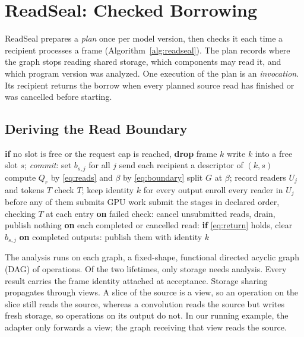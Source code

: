 \documentclass[conference]{IEEEtran}
\begin{document}
\section{ReadSeal: Checked Borrowing}
\label{sec:readseal}

ReadSeal prepares a \emph{plan} once per model version, then checks it each time a recipient processes a frame (Algorithm~\ref{alg:readseal}). The plan records where the graph stops reading shared storage, which components may read it, and which program version was analyzed. One execution of the plan is an \emph{invocation}. Its recipient returns the borrow when every planned source read has finished or was cancelled before starting.

\subsection{Deriving the Read Boundary}
\label{sec:derive}

\begin{algorithm}[t]
\caption{BIM's commit and ReadSeal's plan and invocation}
\label{alg:readseal}
\footnotesize
\begin{algorithmic}[1]
\State \textbf{if} no slot is free or the request cap is reached, \textbf{drop} frame $k$
\State write $k$ into a free slot $s$; \emph{commit}: set $b_{s,j}$ for all $j$
\State send each recipient a descriptor of $(k,s)$
\EndProcedure
{}
\State compute $Q_r$ by \eqref{eq:reads} and $\beta$ by \eqref{eq:boundary}
\State split $G$ at $\beta$; record readers $U_j$ and tokens $T$
\EndProcedure
{}
\State check $T$; keep identity $k$ for every output
\State enroll every reader in $U_j$ before any of them submits GPU work
\State submit the stages in declared order, checking $T$ at each entry
\State \textbf{on} failed check: cancel unsubmitted reads, drain, publish nothing
\State \textbf{on} each completed or cancelled read: \textbf{if} \eqref{eq:return} holds, clear $b_{s,j}$
\State \textbf{on} completed outputs: publish them with identity $k$
\EndProcedure
\end{algorithmic}
\end{algorithm}

The analysis runs on each graph, a fixed-shape, functional directed acyclic graph (DAG) of operations. Of the two lifetimes, only storage needs analysis. Every result carries the frame identity attached at acceptance. Storage sharing propagates through views. A slice of the source is a view, so an operation on the slice still reads the source, whereas a convolution reads the source but writes fresh storage, so operations on its output do not. In our running example, the adapter only forwards a view; the graph receiving that view reads the source.
\end{document}

